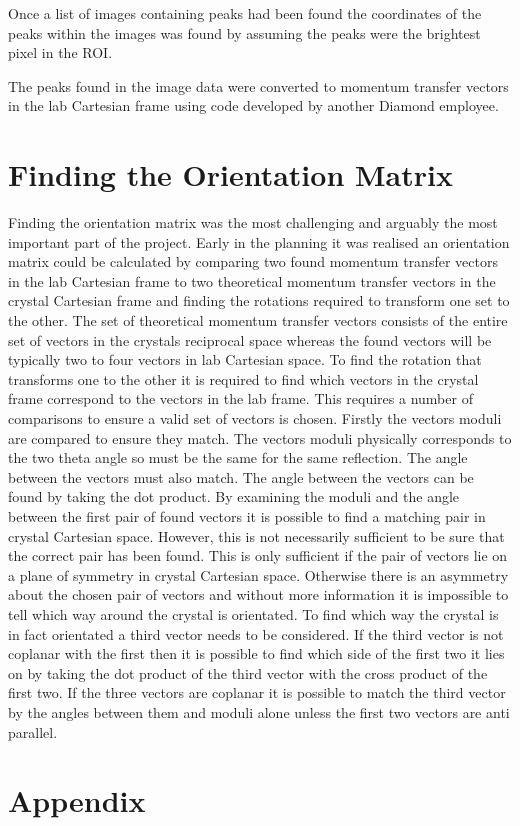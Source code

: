 \documentclass[10pt,a4paper]{article}
\begin{document}
\begin{multicols}{2}
Once a list of images containing peaks had been found the coordinates of the peaks within the images was found by assuming the peaks were the brightest pixel in the ROI.

The peaks found in the image data were converted to momentum transfer vectors in the lab Cartesian frame using code developed by another Diamond employee.

\section*{Finding the Orientation Matrix}
Finding the orientation matrix was the most challenging and arguably the most important part of the project. Early in the planning it was realised an orientation matrix could be calculated by comparing two found momentum transfer vectors in the lab Cartesian frame to two theoretical momentum transfer vectors in the crystal Cartesian frame and finding the rotations required to transform one set to the other. The set of theoretical momentum transfer vectors consists of the entire set of vectors in the crystals reciprocal space %
whereas the found vectors will be typically two to four vectors in lab Cartesian space. To find the rotation that transforms one to the other it is required to find which vectors in the crystal frame correspond to the vectors in the lab frame. This requires a number of comparisons to ensure a valid set of vectors is chosen. Firstly the vectors moduli are compared to ensure they match. The vectors moduli physically corresponds to the two theta angle so must be the same for the same reflection. The angle between the vectors must also match. The angle between the vectors can be found by taking the dot product. By examining the moduli and the angle between the first pair of found vectors it is possible to find a matching pair in crystal Cartesian space. However, this is not necessarily sufficient to be sure that the correct pair has been found. This is only sufficient if the pair of vectors lie on a plane of symmetry in crystal Cartesian space. Otherwise there is an asymmetry about the chosen pair of vectors and without more information it is impossible to tell which way around the crystal is orientated. %
To find which way the crystal is in fact orientated a third vector needs to be considered. If the third vector is not coplanar with the first then it is possible to find which side of the first two it lies on by taking the dot product of the third vector with the cross product of the first two. If the three vectors are coplanar it is possible to match the third vector by the angles between them and moduli alone unless the first two vectors are anti parallel.  

\end{multicols}




\section*{Appendix}
\end{document}
